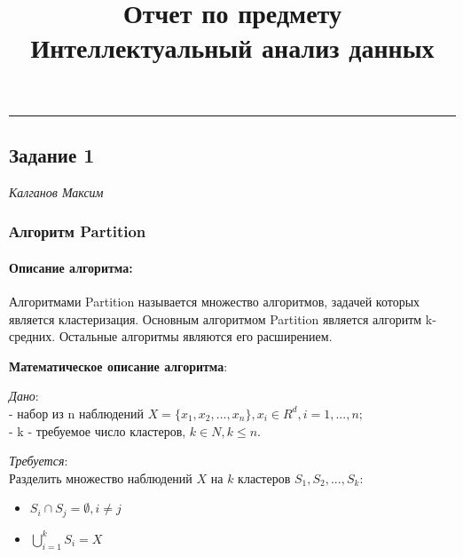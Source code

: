 \documentclass[
]{article}
\title{Отчет по предмету Интеллектуальный анализ данных}
\author{}
\date{\vspace{-2.5em}}
\providecommand{\tightlist}{%
  \setlength{\itemsep}{0pt}\setlength{\parskip}{0pt}}
\begin{document}
\maketitle

\begin{center}\rule{0.5\linewidth}{0.5pt}\end{center}

\hypertarget{ux437ux430ux434ux430ux43dux438ux435-1}{%
\subsection{Задание 1}\label{ux437ux430ux434ux430ux43dux438ux435-1}}

\emph{Калганов Максим}

\hypertarget{ux430ux43bux433ux43eux440ux438ux442ux43c-partition}{%
\subsubsection{Алгоритм
Partition}\label{ux430ux43bux433ux43eux440ux438ux442ux43c-partition}}

\hypertarget{ux43eux43fux438ux441ux430ux43dux438ux435-ux430ux43bux433ux43eux440ux438ux442ux43cux430}{%
\paragraph{Описание
алгоритма:}\label{ux43eux43fux438ux441ux430ux43dux438ux435-ux430ux43bux433ux43eux440ux438ux442ux43cux430}}

Алгоритмами Partition называется множество алгоритмов, задачей которых
является кластеризация. Основным алгоритмом Partition является алгоритм
k-средних. Остальные алгоритмы являются его расширением.

\textbf{Математическое описание алгоритма}:

\emph{Дано}:\\
- набор из n наблюдений \(X=\{x_1,x_2,...,x_n\},x_i∈R^d, i=1,...,n;\)\\
- k - требуемое число кластеров, \(k∈N, k≤n\).

\emph{Требуется}:\\
Разделить множество наблюдений \(X\) на \(k\) кластеров
\(S_1,S_2,...,S_k\):

\begin{itemize}
\tightlist
\item
  \(S_i∩S_j=∅,i≠j\)
\item
  \(⋃^k_{i=1}S_i=X\)
\end{itemize}
\end{document}
